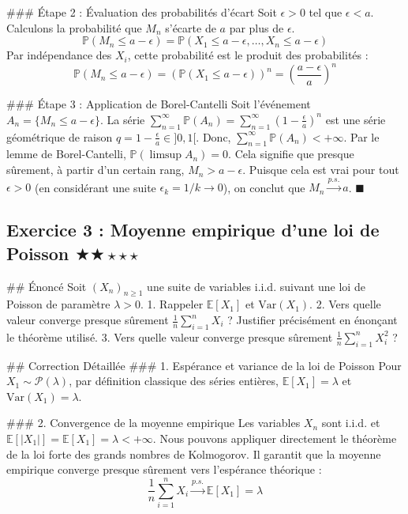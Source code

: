 \documentclass[11pt,a4paper]{article}
\begin{document}
\#\#\# Étape 2 : Évaluation des probabilités d'écart
Soit $\epsilon > 0$ tel que $\epsilon < a$. Calculons la probabilité que $M_n$ s'écarte de $a$ par plus de $\epsilon$.
$$ \mathbb{P}(M_n \le a - \epsilon) = \mathbb{P}(X_1 \le a - \epsilon, \dots, X_n \le a - \epsilon) $$
Par indépendance des $X_i$, cette probabilité est le produit des probabilités :
$$ \mathbb{P}(M_n \le a - \epsilon) = (\mathbb{P}(X_1 \le a - \epsilon))^n = \left( \frac{a - \epsilon}{a} \right)^n $$

\#\#\# Étape 3 : Application de Borel-Cantelli
Soit l'événement $A_n = \{ M_n \le a - \epsilon \}$.
La série $\sum_{n=1}^\infty \mathbb{P}(A_n) = \sum_{n=1}^\infty \left( 1 - \frac{\epsilon}{a} \right)^n$ est une série géométrique de raison $q = 1 - \frac{\epsilon}{a} \in ]0, 1[$.
Donc, $\sum_{n=1}^\infty \mathbb{P}(A_n) < +\infty$.
Par le lemme de Borel-Cantelli, $\mathbb{P}(\limsup A_n) = 0$. Cela signifie que presque sûrement, à partir d'un certain rang, $M_n > a - \epsilon$.
Puisque cela est vrai pour tout $\epsilon > 0$ (en considérant une suite $\epsilon_k = 1/k \to 0$), on conclut que $M_n \xrightarrow{p.s.} a$. $\blacksquare$


\subsection*{Exercice 3 : Moyenne empirique d'une loi de Poisson \quad $\bigstar\bigstar\star\star\star$}

\#\# Énoncé
Soit $(X_n)_{n \ge 1}$ une suite de variables i.i.d. suivant une loi de Poisson de paramètre $\lambda > 0$.
1. Rappeler $\mathbb{E}[X_1]$ et $\text{Var}(X_1)$.
2. Vers quelle valeur converge presque sûrement $\frac{1}{n} \sum_{i=1}^n X_i$ ? Justifier précisément en énonçant le théorème utilisé.
3. Vers quelle valeur converge presque sûrement $\frac{1}{n} \sum_{i=1}^n X_i^2$ ?

\#\# Correction Détaillée
\#\#\# 1. Espérance et variance de la loi de Poisson
Pour $X_1 \sim \mathcal{P}(\lambda)$, par définition classique des séries entières, $\mathbb{E}[X_1] = \lambda$ et $\text{Var}(X_1) = \lambda$.

\#\#\# 2. Convergence de la moyenne empirique
Les variables $X_n$ sont i.i.d. et $\mathbb{E}[|X_1|] = \mathbb{E}[X_1] = \lambda < +\infty$.
Nous pouvons appliquer directement le théorème de la loi forte des grands nombres de Kolmogorov. Il garantit que la moyenne empirique converge presque sûrement vers l'espérance théorique :
$$ \frac{1}{n} \sum_{i=1}^n X_i \xrightarrow{p.s.} \mathbb{E}[X_1] = \lambda $$
\end{document}
